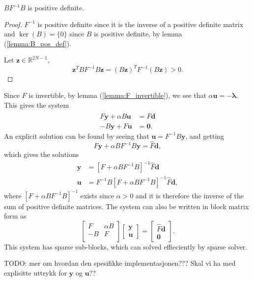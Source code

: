 \begin{lemma}
    $BF^{-1}B$ is positive definite.
\end{lemma}
\begin{proof}
    $F^{-1}$ is positive definite since it is the inverse of a positive definite matrix and $\ker(B) = \{0\}$ since $B$ is positive definite, by lemma (\ref{lemma:B_pos_def}).
    
    Let $\mathbf{z} \in \mathds{R}^{2N-1}$,
    $$\mathbf{z}^T BF^{-1}B \mathbf{z} = (B\mathbf{z})^T F^{-1}(B\mathbf{z}) > 0.$$
\end{proof}
Since $F$ is invertible, by lemma (\ref{lemma:F_invertible}), we see that $\alpha \mathbf{u}= -\mathbf{\lambda}$. 
This gives the system
\begin{align}
    \label{eq:lagrange_conditions}
     F \mathbf{y} + \alpha B \mathbf{u} &= \hat{F}\mathbf{d} \\
    -B \mathbf{y} + F \mathbf{u} &= \mathbf{0}.
\end{align}
An explicit solution can be found by seeing that $\mathbf{u}=F^{-1}B \mathbf{y}$, and getting
$$ F\mathbf{y} + \alpha B F^{-1}B \mathbf{y} = \hat{F}\mathbf{d},$$
which gives the solutions
\begin{align*}
    \mathbf{y} &= \left[F + \alpha B F^{-1}B \right]^{-1} \hat{F}\mathbf{d} \\
    \mathbf{u} &= F^{-1} B \left[F + \alpha B F^{-1}B \right]^{-1} \hat{F}\mathbf{d},
\end{align*}
where $\left[F + \alpha B F^{-1}B \right]^{-1}$ exists since $\alpha > 0$ and it is therefore the inverse of the sum of positive definite matrices.
The system can also be written in block matrix form as
$$
\begin{bmatrix}
   F & \alpha B \\
   -B & F \\
\end{bmatrix}
\begin{bmatrix}
    \mathbf{y} \\
    \mathbf{u}
\end{bmatrix}
= 
\begin{bmatrix} \hat{F}\mathbf{d} \\
    \mathbf{0}
\end{bmatrix}.
$$
This system has sparse sub-blocks, which can solved
effieciently by sparse solver.

TODO: mer om hvordan den spesifikke implementasjonen??? Skal vi ha med explisitte uttrykk for $\mathbf{y}$ og $\mathbf{u}$??

